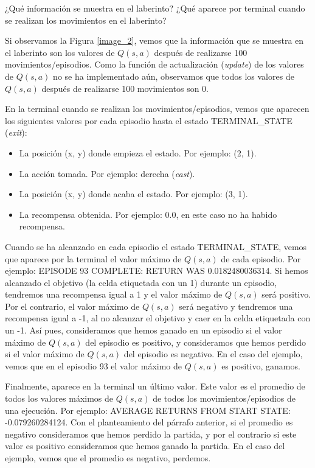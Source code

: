 \documentclass[11pt]{exam}
\begin{document}
\begin{questions}
{ \question ¿Qué información se muestra en el laberinto? ¿Qué aparece por terminal cuando se realizan los movimientos en el laberinto? 
}

Si observamos la Figura \ref{image_2}, vemos que la información que se muestra en el laberinto son los valores de $Q(s,a)$ después de realizarse 100 movimientos/episodios. Como la función de actualización (\textit{update}) de los valores de $Q(s,a)$ no se ha implementado aún, observamos que todos los valores de $Q(s,a)$ después de realizarse 100 movimientos son 0.

En la terminal cuando se realizan los movimientos/episodios, vemos que aparecen los siguientes valores por cada episodio hasta el estado TERMINAL\_STATE (\textit{exit}):

\begin{itemize}
	\item La posición (x, y) donde empieza el estado. Por ejemplo: (2, 1).
	\item La acción tomada. Por ejemplo: derecha (\textit{east}).
	\item La posición (x, y) donde acaba el estado. Por ejemplo: (3, 1).
	\item La recompensa obtenida. Por ejemplo: 0.0, en este caso no ha habido recompensa. 
\end{itemize}

Cuando se ha alcanzado en cada episodio el estado TERMINAL\_STATE, vemos que aparece por la terminal el valor máximo de $Q(s,a)$ de cada episodio. Por ejemplo: EPISODE 93 COMPLETE: RETURN WAS 0.0182480036314. Si hemos alcanzado el objetivo (la celda etiquetada con un 1) durante un episodio, tendremos una recompensa igual a 1 y el valor máximo de $Q(s,a)$ será positivo. Por el contrario, el valor máximo de $Q(s,a)$ será negativo y tendremos una recompensa igual a -1, al no alcanzar el objetivo y caer en la celda etiquetada con un -1. Así pues, consideramos que hemos ganado en un episodio si el valor máximo de $Q(s,a)$ del episodio es positivo, y consideramos que hemos perdido si el valor máximo de $Q(s,a)$ del episodio es negativo. En el caso del ejemplo, vemos que en el episodio 93 el valor máximo de $Q(s,a)$ es positivo, ganamos.

Finalmente, aparece en la terminal un último valor. Este valor es el promedio de todos los valores máximos de $Q(s,a)$ de todos los movimientos/episodios de una ejecución. Por ejemplo: AVERAGE RETURNS FROM START STATE: -0.079260284124. Con el planteamiento del párrafo anterior, si el promedio es negativo consideramos que hemos perdido la partida, y por el contrario si este valor es positivo consideramos que hemos ganado la partida. En el caso del ejemplo, vemos que el promedio es negativo, perdemos.


\end{questions}
\end{document}
